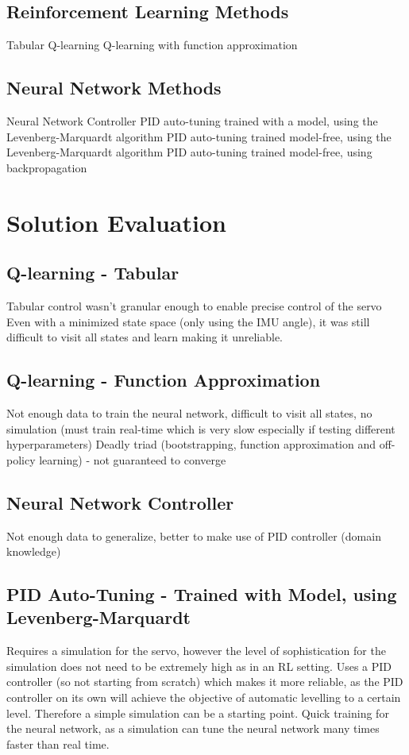 \documentclass[letterpaper,12pt]{article}
\begin{document}
\subsection{Reinforcement Learning Methods}
Tabular Q-learning
Q-learning with function approximation


\subsection{Neural Network Methods}
Neural Network Controller
PID auto-tuning trained with a model, using the Levenberg-Marquardt algorithm
PID auto-tuning trained model-free, using the Levenberg-Marquardt algorithm
PID auto-tuning trained model-free, using backpropagation

\section{Solution Evaluation}
\subsection{Q-learning - Tabular}
Tabular control wasn't granular enough to enable precise control of the servo
Even with a minimized state space (only using the IMU angle), it was still difficult to visit all states and learn making it unreliable.
\subsection{Q-learning - Function Approximation}
Not enough data to train the neural network, difficult to visit all states, no simulation (must train real-time which is very slow especially if testing different hyperparameters)
Deadly triad (bootstrapping, function approximation and off-policy learning) - not guaranteed to converge

\subsection{Neural Network Controller}
Not enough data to generalize, better to make use of PID controller (domain knowledge)
\subsection{PID Auto-Tuning - Trained with Model, using Levenberg-Marquardt}
Requires a simulation for the servo, however the level of sophistication for the simulation does not need to be extremely high as in an RL setting. Uses a PID controller (so not starting from scratch) which makes it more reliable, as the PID controller on its own will achieve the objective of automatic levelling to a certain level. Therefore a simple simulation can be a starting point.
Quick training for the neural network, as a simulation can tune the neural network many times faster than real time.
\end{document}
